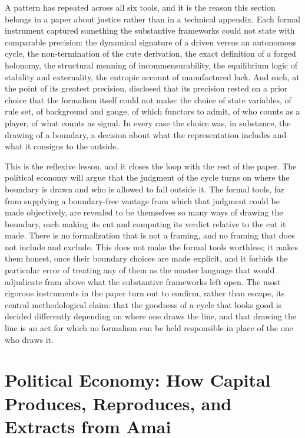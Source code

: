 \documentclass[11pt,a4paper]{article}
\begin{document}
A pattern has repeated across all six tools, and it is the reason this section belongs in a paper about justice rather than in a technical appendix. Each formal instrument captured something the substantive frameworks could not state with comparable precision: the dynamical signature of a driven versus an autonomous cycle, the non-termination of the cute derivation, the exact definition of a forged holonomy, the structural meaning of incommensurability, the equilibrium logic of stability and externality, the entropic account of manufactured lack. And each, at the point of its greatest precision, disclosed that its precision rested on a prior choice that the formalism itself could not make: the choice of state variables, of rule set, of background and gauge, of which functors to admit, of who counts as a player, of what counts as signal. In every case the choice was, in substance, the drawing of a boundary, a decision about what the representation includes and what it consigns to the outside.

This is the reflexive lesson, and it closes the loop with the rest of the paper. The political economy will argue that the judgment of the cycle turns on where the boundary is drawn and who is allowed to fall outside it. The formal tools, far from supplying a boundary-free vantage from which that judgment could be made objectively, are revealed to be themselves so many ways of drawing the boundary, each making its cut and computing its verdict relative to the cut it made. There is no formalization that is not a framing, and no framing that does not include and exclude. This does not make the formal tools worthless; it makes them honest, once their boundary choices are made explicit, and it forbids the particular error of treating any of them as the master language that would adjudicate from above what the substantive frameworks left open. The most rigorous instruments in the paper turn out to confirm, rather than escape, its central methodological claim: that the goodness of a cycle that looks good is decided differently depending on where one draws the line, and that drawing the line is an act for which no formalism can be held responsible in place of the one who draws it.

\section{Political Economy: How Capital Produces, Reproduces, and Extracts from Amai}
\end{document}
